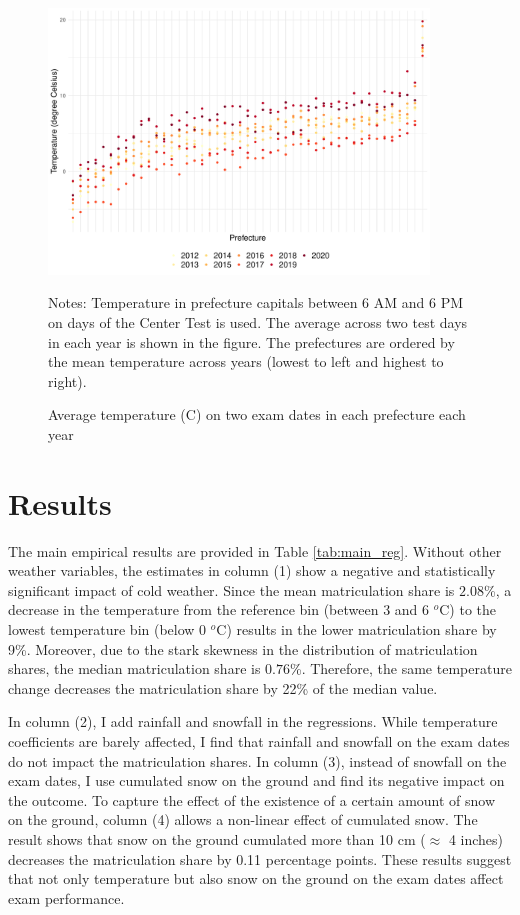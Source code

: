 \documentclass[12pt,letterpaper]{article}
\begin{document}
\begin{figure}[H]
  \centering
  \caption{Average temperature (\degree C) on two exam dates in each prefecture each year}
  \includegraphics[width = 0.9\textwidth]{../Output/images/temperature_diff.pdf}
  \label{fig:temperature_diff}
  \footnotesize
  \begin{tablenotes}
    \item Notes:
      Temperature in prefecture capitals between 6 AM and 6 PM on days of the Center Test is used.
      The average across two test days in each year is shown in the figure.
      The prefectures are ordered by the mean temperature across years (lowest to left and highest to right).
  \end{tablenotes}
\end{figure}

\section{Results}\label{sec:results}

The main empirical results are provided in Table \ref{tab:main_reg}.
Without other weather variables, the estimates in column (1) show a negative and statistically significant impact of cold weather.
Since the mean matriculation share is $2.08$\%, a decrease in the temperature from the reference bin (between 3 and 6 $^o$C) to the lowest temperature bin (below 0 $^o$C) results in the lower matriculation share by 9\%.
Moreover, due to the stark skewness in the distribution of matriculation shares, the median matriculation share is $0.76$\%.
Therefore, the same temperature change decreases the matriculation share by 22\% of the median value.

In column (2), I add rainfall and snowfall in the regressions.
While temperature coefficients are barely affected, I find that rainfall and snowfall on the exam dates do not impact the matriculation shares.
In column (3), instead of snowfall on the exam dates, I use cumulated snow on the ground and find its negative impact on the outcome. 
To capture the effect of the existence of a certain amount of snow on the ground, column (4) allows a non-linear effect of cumulated snow.
The result shows that snow on the ground cumulated more than 10 cm ($\approx$ 4 inches) decreases the matriculation share by 0.11 percentage points.
These results suggest that not only temperature but also snow on the ground on the exam dates affect exam performance.
\end{document}
